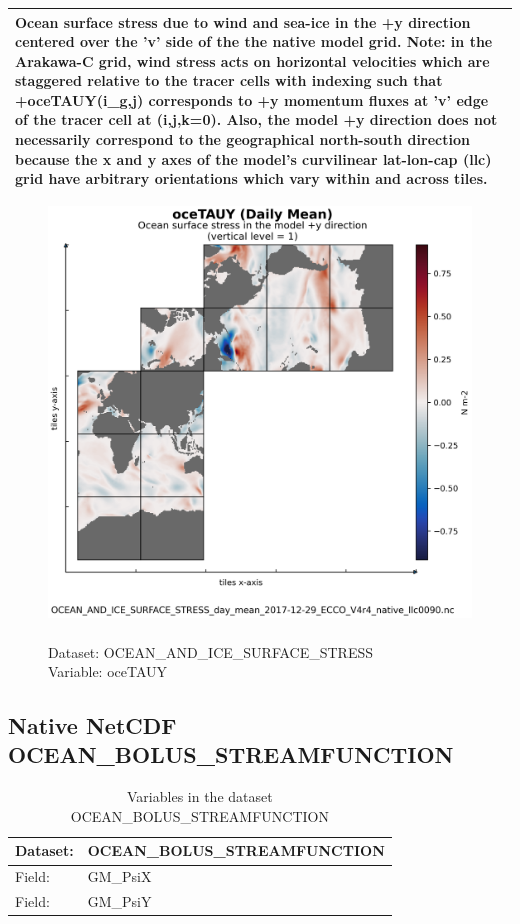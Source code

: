 \begin{longtable}{|p{}|p{}|p{}|p{}|}
\multicolumn{4}{|p{1\textwidth}|}{Ocean surface stress due to wind and sea-ice in the +y direction centered over the 'v' side of the the native model grid. Note: in the Arakawa-C grid, wind stress acts on horizontal velocities which are staggered relative to the tracer cells with indexing such that +oceTAUY(i\_g,j) corresponds to +y momentum fluxes at 'v' edge of the tracer cell at (i,j,k=0). Also, the model +y direction does not necessarily correspond to the geographical north-south direction because the x and y axes of the model's curvilinear lat-lon-cap (llc) grid have arbitrary orientations which vary within and across tiles.} \\ \hline
\end{longtable}

\begin{figure}[H]
\centering
\includegraphics[scale=0.5]{../images/plots/native_plots/Ocean_and_Sea-Ice_Surface_Stress/oceTAUY.png}
\caption{\\Dataset: OCEAN\_AND\_ICE\_SURFACE\_STRESS\\Variable: oceTAUY}
\label{tab:table-OCEAN_AND_ICE_SURFACE_STRESS_oceTAUY-Plot}
\end{figure}
\pagebreak
\subsection{Native NetCDF OCEAN\_BOLUS\_STREAMFUNCTION}
\newp
\begin{longtable}{|p{}|p{}|}
\caption{Variables in the dataset OCEAN\_BOLUS\_STREAMFUNCTION}
\label{tab:table-OCEAN_BOLUS_STREAMFUNCTION-fields} \\ 
\hline \endhead \hline \endfoot
\rowcolor{lightgray} \textbf{Dataset:} & \textbf{OCEAN\_BOLUS\_STREAMFUNCTION} \\ \hline
Field: &GM\_PsiX \\ \hline
Field: &GM\_PsiY \\ \hline
\end{longtable}

